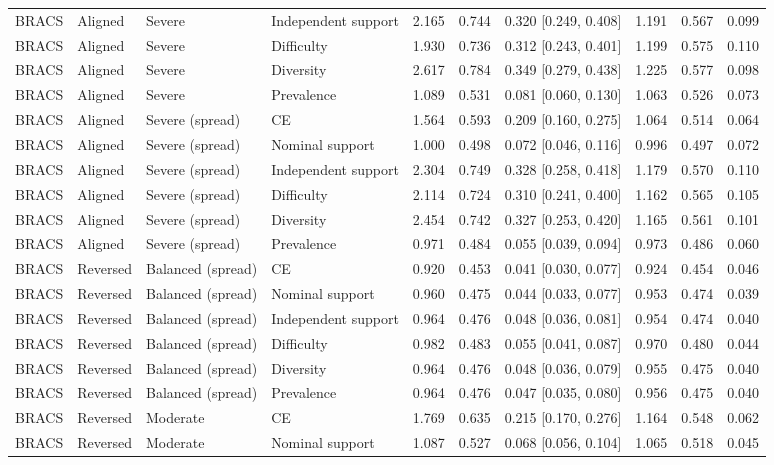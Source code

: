 \begin{longtable}{llllllllll}
BRACS & Aligned & Severe & Independent support & 2.165 & 0.744 & 0.320 [0.249, 0.408] & 1.191 & 0.567 & 0.099 \\
BRACS & Aligned & Severe & Difficulty & 1.930 & 0.736 & 0.312 [0.243, 0.401] & 1.199 & 0.575 & 0.110 \\
BRACS & Aligned & Severe & Diversity & 2.617 & 0.784 & 0.349 [0.279, 0.438] & 1.225 & 0.577 & 0.098 \\
BRACS & Aligned & Severe & Prevalence & 1.089 & 0.531 & 0.081 [0.060, 0.130] & 1.063 & 0.526 & 0.073 \\
BRACS & Aligned & Severe (spread) & CE & 1.564 & 0.593 & 0.209 [0.160, 0.275] & 1.064 & 0.514 & 0.064 \\
BRACS & Aligned & Severe (spread) & Nominal support & 1.000 & 0.498 & 0.072 [0.046, 0.116] & 0.996 & 0.497 & 0.072 \\
BRACS & Aligned & Severe (spread) & Independent support & 2.304 & 0.749 & 0.328 [0.258, 0.418] & 1.179 & 0.570 & 0.110 \\
BRACS & Aligned & Severe (spread) & Difficulty & 2.114 & 0.724 & 0.310 [0.241, 0.400] & 1.162 & 0.565 & 0.105 \\
BRACS & Aligned & Severe (spread) & Diversity & 2.454 & 0.742 & 0.327 [0.253, 0.420] & 1.165 & 0.561 & 0.101 \\
BRACS & Aligned & Severe (spread) & Prevalence & 0.971 & 0.484 & 0.055 [0.039, 0.094] & 0.973 & 0.486 & 0.060 \\
BRACS & Reversed & Balanced (spread) & CE & 0.920 & 0.453 & 0.041 [0.030, 0.077] & 0.924 & 0.454 & 0.046 \\
BRACS & Reversed & Balanced (spread) & Nominal support & 0.960 & 0.475 & 0.044 [0.033, 0.077] & 0.953 & 0.474 & 0.039 \\
BRACS & Reversed & Balanced (spread) & Independent support & 0.964 & 0.476 & 0.048 [0.036, 0.081] & 0.954 & 0.474 & 0.040 \\
BRACS & Reversed & Balanced (spread) & Difficulty & 0.982 & 0.483 & 0.055 [0.041, 0.087] & 0.970 & 0.480 & 0.044 \\
BRACS & Reversed & Balanced (spread) & Diversity & 0.964 & 0.476 & 0.048 [0.036, 0.079] & 0.955 & 0.475 & 0.040 \\
BRACS & Reversed & Balanced (spread) & Prevalence & 0.964 & 0.476 & 0.047 [0.035, 0.080] & 0.956 & 0.475 & 0.040 \\
BRACS & Reversed & Moderate & CE & 1.769 & 0.635 & 0.215 [0.170, 0.276] & 1.164 & 0.548 & 0.062 \\
BRACS & Reversed & Moderate & Nominal support & 1.087 & 0.527 & 0.068 [0.056, 0.104] & 1.065 & 0.518 & 0.045 \\

\end{longtable}
